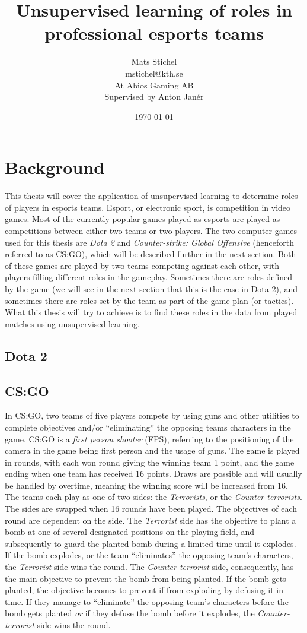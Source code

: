 \documentclass{article}
\title{Unsupervised learning of roles in professional esports teams}
\author{Mats Stichel \\ mstichel@kth.se \\ At Abios Gaming AB \\ Supervised by Anton Janér}
\date{\today}
\begin{document}
\maketitle

\section{Background}
This thesis will cover the application of unsupervised learning to determine roles of players in esports teams. Esport, or electronic sport, is competition in video games. Most of the currently popular games played as esports are played as competitions between either two teams or two players. The two computer games used for this thesis are {\it Dota 2} and {\it Counter-strike: Global Offensive} (henceforth referred to as CS:GO), which will be described further in the next section. Both of these games are played by two teams competing against each other, with players filling different roles in the gameplay. Sometimes there are roles defined by the game (we will see in the next section that this is the case in Dota 2), and sometimes there are roles set by the team as part of the game plan (or tactics). What this thesis will try to achieve is to find these roles in the data from played matches using unsupervised learning.

\subsection{Dota 2}


\subsection{CS:GO}
In CS:GO, two teams of five players compete by using guns and other utilities to complete objectives and/or ``eliminating'' the opposing teams characters in the game. CS:GO is a {\it first person shooter} (FPS), referring to the positioning of the camera in the game being first person and the usage of guns. The game is played in rounds, with each won round giving the winning team 1 point, and the game ending when one team has received 16 points. Draws are possible and will usually be handled by overtime, meaning the winning score will be increased from 16. The teams each play as one of two sides: the {\it Terrorists}, or the {\it Counter-terrorists}. The sides are swapped when 16 rounds have been played. The objectives of each round are dependent on the side. The {\it Terrorist} side has the objective to plant a bomb at one of several designated positions on the playing field, and subsequently to guard the planted bomb during a limited time until it explodes. If the bomb explodes, or the team ``eliminates'' the opposing team's characters, the {\it Terrorist} side wins the round. The {\it Counter-terrorist} side, consequently, has the main objective to prevent the bomb from being planted. If the bomb gets planted, the objective becomes to prevent if from exploding by defusing it in time. If they manage to ``eliminate'' the opposing team's characters before the bomb gets planted {\it or} if they defuse the bomb before it explodes, the {\it Counter-terrorist} side wins the round.
\end{document}
